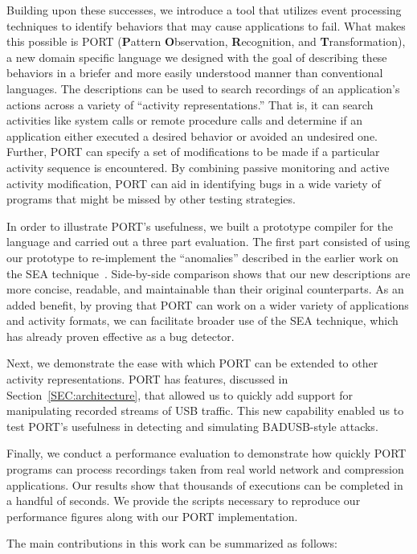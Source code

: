 Building upon these successes,
we introduce a tool
that utilizes event processing techniques
to identify
behaviors 
that may cause applications to fail.
What makes this possible is PORT
(\textbf{P}attern \textbf{O}bservation, \textbf{R}ecognition, and
\textbf{T}ransformation),
a new domain specific language
we designed with the goal of
describing
these behaviors
in a briefer and more easily understood manner than conventional languages.
The descriptions can be used
to search recordings of an application's actions
across a variety of ``activity representations.'' That is, it can search activities like
system calls
or remote procedure calls and determine if  an application either executed a desired behavior
or avoided an undesired one.
Further, PORT can specify
a set of modifications
to be made
if a particular activity sequence is encountered.
By combining passive monitoring and active activity modification,
PORT can aid in identifying bugs
in a wide variety of programs
that might be missed by other testing strategies.

In order to illustrate PORT's usefulness,
we built a prototype compiler
for the language
and carried out a three part evaluation.
The first part consisted of using our prototype
to
re-implement the ``anomalies''
described in the earlier work on the SEA technique~\cite{DBLP:conf/issre/MooreCFW19}.
Side-by-side comparison shows that our new
descriptions are more concise,
readable,
and maintainable
than their original counterparts.
As an added benefit, by proving that
PORT can work on a wider variety of applications and activity formats, we can facilitate broader use of the SEA technique,
which has already proven effective as a bug detector.

Next,
we demonstrate the ease with which PORT can be extended to
other activity representations. 
PORT has features, discussed in
Section~\ref{SEC:architecture},
that allowed us to quickly
add support for manipulating recorded streams of USB
traffic. This new capability enabled us to test PORT's usefulness in detecting and simulating BADUSB-style attacks.

Finally,
we conduct a performance evaluation
to demonstrate how quickly  PORT programs can
process recordings taken from real world network and compression applications.
Our results show that thousands of executions can be completed in a handful of seconds.  We provide the scripts necessary to reproduce our performance figures along with our PORT implementation.


The main contributions in this work can be summarized as follows:

